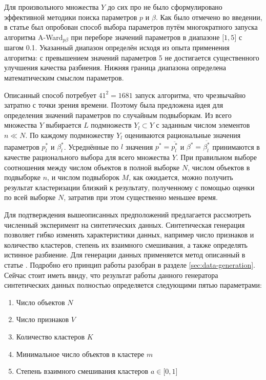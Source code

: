\documentclass[12pt]{a&t}
\begin{document}
Для произвольного множества $ Y $ до сих про не было сформулировано эффективной методики поиска параметров  $ p $ и $ \beta $. Как было отмечено во введении, в статье \cite{SW-Based-Search} был опробован способ выбора параметров путём многократного запуска алгоритма \mbox{A-Ward$ _{p\beta} $} при переборе значений параметров в диапазоне $ \lbrack 1,5 \rbrack $ с шагом 0.1. Указанный диапазон определён исходя из опыта применения алгоритма: с превышением значений параметров 5 не достигается существенного улучшения качества разбиения. Нижняя граница диапазона определена математическим смыслом параметров.  

Описанный способ потребует $ 41^2= 1681 $ запуск алгоритма, что чрезвычайно затратно с точки зрения времени. Поэтому была предложена идея для определения значений параметров по случайным подвыборкам. Из всего множества $ Y $ выбирается $ L $ подмножеств $ Y_l \subset Y $ с заданным числом элементов $ n \ll N $. По каждому подмножеству  $ Y_l $ оцениваются рациональные значения параметров $ p^*_l $ и $ \beta^*_l $. Усреднённые по $ l $ значения $ p^* = \overline{p^*_l} $ и $ \beta^* = \overline{\beta^*_l} $ принимаются в качестве рационального выбора для всего множества $ Y $. При правильном выборе соотношения между числом объектов в полной выборке $ N $, числом объектов в подвыборке $ n $, и числом подвыборок $ M $, как ожидается, можно получить результат кластеризации близкий к результату, полученному с помощью оценки по всей выборке $ N $, затратив при этом существенно меньшее время.

Для подтверждения вышеописанных предположений предлагается рассмотреть численный эксперимент на синтетических данных. Синтетическая генерация позволяет гибко изменять характеристики данных, например число признаков и количество кластеров, степень их взаимного смешивания, а также определять истинное разбиение. Для генерации данных применяется метод описанный в статье \cite{Kovaleva}. Подробно его принцип работы разобран в разделе \ref{sec:data-generation}. Сейчас стоит иметь ввиду, что результат работы данного генератора синтетических данных полностью определяется следующими пятью параметрами:
\begin{enumerate}
	\item
	Число объектов $ N $
	\item
	Число признаков $ V $
	\item
	Количество кластеров $ K $
	\item 
	Минимальное число объектов в кластере $ m $
	\item
	Степень взаимного смешивания кластеров $ a \in \lbrack0,1\rbrack $
\end{enumerate}
\end{document}
